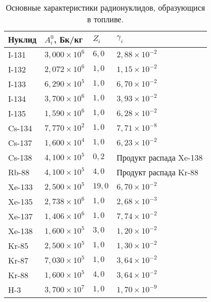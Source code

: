 \clearpage


\renewcommand{\thetable}{\textmd{Б.}\arabic{table}}
\setcounter{table}{0}
\begin{table}[ht]
    \small
    \caption{Основные характеристики радионуклидов, образующися в топливе.}
    \label{table_tvel_radio}
    \setlength{\extrarowheight}{0.5mm}
    \centering
    \begin{tabular}{|M{0.225\textwidth}|M{0.225\textwidth}|M{0.225\textwidth}|M{0.225\textwidth}|}
    \hline Нуклид & $A_{i}^{0}$, Бк/кг & $Z_i$ & $\gamma_{i}$ \\

    \hline I-131 & $3,000 \times 10^6$ & $6,0$ & $2,88 \times 10^{-2}$ \\
    \hline I-132 & $2,072 \times 10^6$ & $1,0$ & $1,15 \times 10^{-2}$ \\ 
    \hline I-133 & $6,290 \times 10^5$ & $1,0$ & $6,70 \times 10^{-2}$ \\
    \hline I-134 & $3,700 \times 10^6$ & $1,0$ & $3,93 \times 10^{-2}$ \\
    \hline I-135 & $1,590 \times 10^6$ & $1,0$ & $6,28 \times 10^{-2}$ \\

    \hline Cs-134 & $7,770 \times 10^2$ & $1,0$ & $7,71 \times 10^{-8}$ \\
    \hline Cs-137 & $1,600 \times 10^4$ & $1,0$ & $6,23 \times 10^{-2}$ \\
    \hline Cs-138 & $4,100 \times 10^5$ & $0,2$ & Продукт распада Xe-138 \\

    \hline Rb-88 & $4,100 \times 10^5$ & $4,0$ & Продукт распада Kr-88 \\

    \hline Xe-133 & $2,500 \times 10^5$ & $19,0$ & $6,70 \times 10^{-2}$ \\
    \hline Xe-135 & $2,738 \times 10^6$ & $1,0$ & $2,68 \times 10^{-3}$ \\
    \hline Xe-137 & $1,406 \times 10^6$ & $1,0$ & $7,74 \times 10^{-2}$ \\
    \hline Xe-138 & $1,600 \times 10^5$ & $3,0$ & $1,20 \times 10^{-2}$ \\
    
    \hline Kr-85 & $2,500 \times 10^5$ & $1,0$ & $1,30 \times 10^{-2}$ \\
    \hline Kr-87 & $7,030 \times 10^5$ & $1,0$ & $3,64 \times 10^{-2}$ \\
    \hline Kr-88 & $1,600 \times 10^5$ & $4,0$ & $3,64 \times 10^{-2}$ \\

    \hline H-3 & $3,700 \times 10^7$ & $1,0$ & $1,70 \times 10^{-9}$ \\
    \hline
    \end{tabular}
\end{table}

